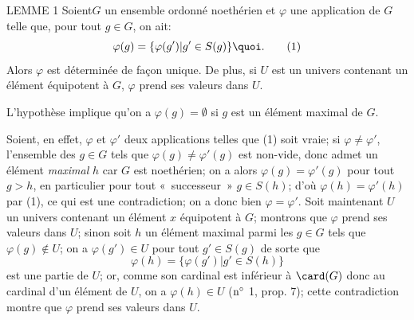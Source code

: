 \begin{enonce*}{LEMME 1}
Soient\pageoriginale $G$ un ensemble ordonné noethérien et $\varphi$
une application de $G$ telle que, pour tout $g\in G$, on ait:
\begin{equation}
\varphi(g)=\{\varphi(g')| g'\in S(g)\}{\quoi}.\tag{1}
\end{equation}
Alors $\varphi$ est déterminée de façon unique. De plus, si $U$ est
un univers contenant un élément équipotent à $G$, $\varphi$ prend
ses valeurs dans $U$.
\end{enonce*}

L'hypothèse implique qu'on a $\varphi(g)=∅$ si $g$ est un
élément maximal de $G$.

Soient, en effet, $\varphi$ et $\varphi'$ deux applications telles
que (1) soit vraie; si $\varphi\neq \varphi'$, l'ensemble des $g\in
G$ tels que $\varphi(g)\neq \varphi'(g)$ est non-vide, donc admet un
élément \emph{maximal} $h$ car $G$ est noethérien; on a alors
$\varphi(g)=\varphi'(g)$ pour tout $g>h$, en particulier pour tout
« successeur » $g\in S(h)$; d'où $\varphi(h)=\varphi'(h)$ par
(1), ce qui est une contradiction; on a donc bien
$\varphi=\varphi'$. Soit maintenant $U$ un univers contenant un
élément $x$ équipotent à $G$; montrons que $\varphi$ prend ses
valeurs dans $U$; sinon soit $h$ un élément maximal parmi les $g\in
G$ tels que $\varphi(g)\not\in U$; on a $\varphi(g')\in U$ pour tout
$g'\in S(g)$ de sorte que
$$
\varphi(h)=\{\varphi(g')| g'\in S(h)\}
$$
est une partie de $U$; or, comme son cardinal est inférieur à
$\card(G)$ donc au cardinal d'un élément de $U$, on a $\varphi(h)\in
U$ (${\rm n^{\circ}}$ 1, prop. 7); cette contradiction montre que
$\varphi$ prend ses valeurs dans $U$.

